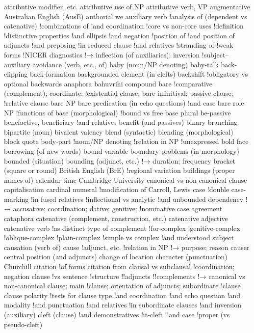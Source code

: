attributive modifier, etc.
attributive use of NP
attributive verb, VP
augmentative
Australian English (AusE)
authorial we
auxiliary verb
!analysis of (dependent vs catenative)
!combinations of
!and coordination
!core vs non-core uses
!definition
!distinctive properties
!and ellipsis
!and negation
!position of
!and position of adjuncts
!and preposing
!in reduced clause
!and relatives
!stranding of
!weak forms
!NICER diagnostics
!→ inflection (of auxiliaries); inversion
!subject--auxiliary
avoidance (verb, etc., of)
baby (noun/NP denoting)
baby-talk
back-clipping
back-formation
backgrounded element (in clefts)
backshift
!obligatory vs optional
backwards anaphora
bahuvrihi compound
bare
!comparative (complement); coordinate;
!existential clause; bare infinitival; passive clause;
!relative clause
bare NP
bare predication (in echo questions)
!and case
bare role NP
!functions of
base (morphological)
!bound vs free
base plural
be-passive
benefactive, beneficiary
!and relatives
benefit (and passives)
binary branching
bipartite (noun)
bivalent valency
blend (syntactic)
blending (morphological)
block quote
body-part
!noun/NP denoting
!relation in NP
!unexpressed
bold face
borrowing (of new words)
bound variable
boundary problems (in morphology)
bounded (situation)
bounding (adjunct, etc.)
!→ duration; frequency
bracket (square or round)
British English (BrE)
!regional variation
buildings (proper names of)
calendar time
Cambridge University
canonical vs non-canonical clause
capitalisation
cardinal numeral
!modification of
Carroll, Lewis
case
!double case-marking
!in fused relatives
!inflectional vs analytic
!and unbounded dependency
!→ accusative; coordination; dative; genitive;
!nominative
case agreement
cataphora
catenative (complement, construction, etc.)
catenative adjective
catenative verb
!as distinct type of complement
!for-complex
!genitive-complex
!oblique-complex
!plain-complex
!simple vs complex
!and understood subject
causation (verb of)
cause
!adjunct, etc.
!relation in NP
!→ purpose; reason
causer
central position (and adjuncts)
change of location
character (punctuation)
Churchill
citation
!of forms
citation from
clausal vs subclausal
!coordination; negation
clause
!vs sentence
!structure
!!adjuncts
!!complements
!→ canonical vs non-canonical clause; main
!clause; orientation of adjuncts; subordinate
!clause
clause polarity
!tests for
clause type
!and coordination
!and echo question
!and modality
!and punctuation
!and relatives
!in subordinate clauses
!and inversion (auxiliary)
cleft (clause)
!and demonstratives
!it-cleft
!!and case
!proper (vs pseudo-cleft)
